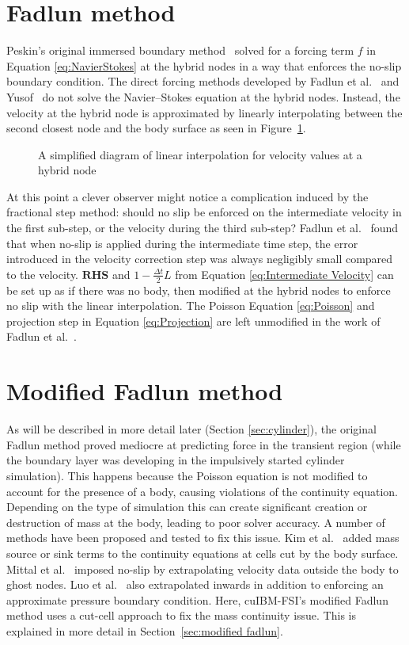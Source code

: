 \section{Fadlun method}
Peskin's original immersed boundary method~\cite{Peskin:1972gh} solved for a forcing term $f$ in Equation \eqref{eq:NavierStokes} at the hybrid nodes in a way that enforces the no-slip boundary condition. 
The direct forcing methods developed by Fadlun et al.~\cite{Fadlun:2000fl} and Yusof~\cite{MohdYusof:1997wh} do not solve the Navier--Stokes equation at the hybrid nodes. 
Instead, the velocity at the hybrid node is approximated by linearly interpolating between the second closest node and the body surface as seen in Figure~\ref{fig:2}. 
\begin{figure}[!htb]
	\centering
	
	\caption{A simplified diagram of linear interpolation for velocity values at a hybrid node}
	\label{fig:2}
\end{figure}
At this point a clever observer might notice a complication induced by the fractional step method: should no slip be enforced on the intermediate velocity in the first sub-step, or the velocity during the third sub-step? 
Fadlun et al.~\cite{Fadlun:2000fl} found that when no-slip is applied during the intermediate time step, the error introduced in the velocity correction step was always negligibly small compared to the velocity. 
$\textbf{RHS}$ and $1-\frac{\Delta t}{2}L$ from Equation \eqref{eq:Intermediate Velocity} can be set up as if there was no body, then modified at the hybrid nodes to enforce no slip with the linear interpolation. 
The Poisson Equation \eqref{eq:Poisson} and projection step in Equation \eqref{eq:Projection} are left unmodified in the work of Fadlun et al.~\cite{Fadlun:2000fl}. 

\section{Modified Fadlun method} 
As will be described in more detail later (Section \ref{sec:cylinder}), the original Fadlun method proved mediocre at predicting force in the transient region (while the boundary layer was developing in the impulsively started cylinder simulation). 
This happens because the Poisson equation is not modified to account for the presence of a body, causing violations of the continuity equation. 
Depending on the type of simulation this can create significant creation or destruction of mass at the body, leading to poor solver accuracy. 
A number of methods have been proposed and tested to fix this issue. 
Kim et al.~\cite{kim2001immersed} added mass source or sink terms to the continuity equations at cells cut by the body surface. 
Mittal et al.~\cite{mittal2008versatile} imposed no-slip by extrapolating velocity data outside the body to ghost nodes. 
Luo et al.~\cite{Luo:2012gx} also extrapolated inwards in addition to enforcing an approximate pressure boundary condition. 
Here, cuIBM-FSI's modified Fadlun method uses a cut-cell approach to fix the mass continuity issue. 
This is explained in more detail in Section~\ref{sec:modified fadlun}.

